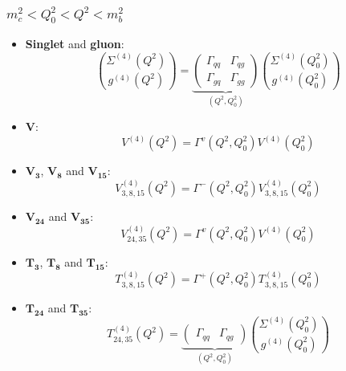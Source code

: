 \documentclass[10pt,a4paper]{article}
\begin{document}
\subsubsection{$m_c^2<Q_0^2<Q^2<m_b^2$}
\begin{itemize}
\item \textbf{Singlet} and \textbf{gluon}:
\begin{equation}
{\Sigma^{(4)}(Q^2) \choose g^{(4)}(Q^2)} =\underbrace{\begin{pmatrix} \Gamma_{qq}& \Gamma_{qg} \\ \Gamma_{gq}& \Gamma_{gg}\end{pmatrix}}_{(Q^2,Q_0^2)}{\Sigma^{(4)}(Q_0^2) \choose g^{(4)}(Q_0^2)}
\end{equation}
\item $\mathbf{V}$:
\begin{equation}
V^{(4)}(Q^2)=\Gamma^{v}(Q^2,Q_0^2)V^{(4)}(Q^2_0)
\end{equation}
\item $\mathbf{V_3}$, $\mathbf{V_8}$ and $\mathbf{V_{15}}$:
\begin{equation}
V^{(4)}_{3,8,15}(Q^2)=\Gamma^{-}(Q^2,Q_0^2)V^{(4)}_{3,8,15}(Q^2_0)
\end{equation}
\item $\mathbf{V_{24}}$ and $\mathbf{V_{35}}$:
\begin{equation}
V_{24,35}^{(4)}(Q^2)=\Gamma^{v}(Q^2,Q^2_0)V^{(4)}(Q_0^2)
\end{equation}
\item $\mathbf{T_3}$, $\mathbf{T_8}$ and $\mathbf{T_{15}}$:
\begin{equation}
T^{(4)}_{3,8,15}(Q^2)=\Gamma^{+}(Q^2,Q_0^2)T^{(4)}_{3,8,15}(Q^2_0)
\end{equation}
\item $\mathbf{T_{24}}$ and $\mathbf{T_{35}}$:
\begin{equation}
T_{24,35}^{(4)}(Q^2) = \underbrace{\begin{pmatrix} \Gamma_{qq} & \Gamma_{qg}\end{pmatrix}}_{(Q^2,Q_0^2)}{\Sigma^{(4)}(Q_0^2) \choose g^{(4)}(Q_0^2)}
\end{equation}
\end{itemize}
\end{document}
